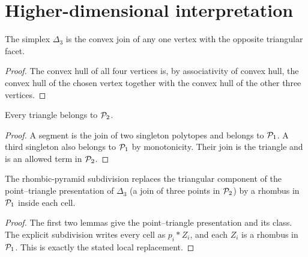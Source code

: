 \section{Higher-dimensional interpretation}

\begin{lemma}
  \label{lem:tetrahedron-point-triangle}
  The simplex $\Delta_3$ is the convex join of any one vertex with the opposite
  triangular facet.
\end{lemma}
\begin{proof}
  The convex hull of all four vertices is, by associativity of convex hull,
  the convex hull of the chosen vertex together with the convex hull of the
  other three vertices.
\end{proof}

\begin{lemma}
  \label{lem:triangle-class-two}
  Every triangle belongs to $\mathcal{P}_2$.
\end{lemma}
\begin{proof}
  A segment is the join of two singleton polytopes and belongs to
  $\mathcal{P}_1$.  A third singleton also belongs to $\mathcal{P}_1$ by monotonicity.
  Their join is the triangle and is an allowed term in $\mathcal{P}_2$.
\end{proof}

\begin{proposition}
  \label{prop:geometric-three-to-one}
  The rhombic-pyramid subdivision replaces the triangular component of the
  point--triangle presentation of $\Delta_3$ (a join of three points in
  $\mathcal{P}_2$) by a rhombus in $\mathcal{P}_1$ inside each cell.
\end{proposition}
\begin{proof}
  The first two lemmas give the point--triangle presentation and its class.
  The explicit subdivision writes every cell as $p_i*Z_i$, and each $Z_i$ is
  a rhombus in $\mathcal{P}_1$.  This is exactly the stated local replacement.
\end{proof}

